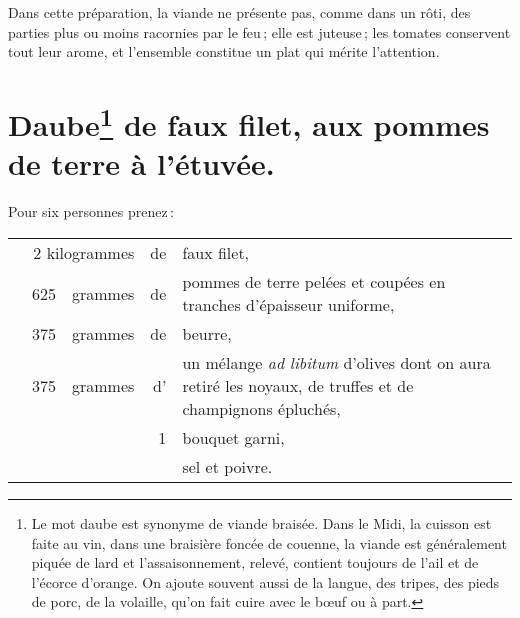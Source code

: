 Dans cette préparation, la viande ne présente pas, comme dans un rôti, des
parties plus ou moins racornies par le feu ; elle est juteuse ; les tomates
conservent tout leur arome, et l'ensemble constitue un plat qui mérite
l'attention.

\section*{\centering Daube\footnote{Le mot daube est synonyme de viande
braisée.
\protect\endgraf
{}
Dans le Midi, la cuisson est faite au vin, dans une braisière foncée
de couenne, la viande est généralement piquée de lard et l'assaisonnement,
relevé, contient toujours de l'ail et de l'écorce d'orange.
\protect\endgraf
On ajoute souvent aussi de la langue, des tripes, des pieds de porc, de la
volaille, qu'on fait cuire avec le bœuf ou à part.} de faux filet, aux pommes
de terre à l'étuvée.}

{}
\label{pg0464-2} \hypertarget{p0464-2}{}

Pour six personnes prenez :

\medskip

\footnotesize
\begin{longtable}{rrrrp{16em}}
  & \multicolumn{2}{r}{2 kilogrammes} & de & faux filet,                                                 \\
  & 625 & grammes & de & pommes de terre pelées et coupées
                         en tranches d'épaisseur uniforme,                                                \\
  & 375 & grammes & de & beurre,                                                                          \\
  & 375 & grammes & d' & un mélange \textit{ad libitum} d'olives
                         dont on aura retiré les noyaux, de truffes
                         et de champignons épluchés,                                                      \\
  &     &         &  1 & bouquet garni,                                                                   \\
  &     &         &    & sel et poivre.                                                                   \\
\end{longtable}
\normalsize

